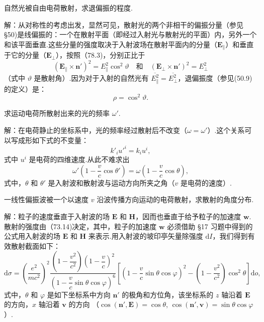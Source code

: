 \begin{xiti}
\quad 自然光被自由电荷散射，求退偏振的程度.

解：从对称性的考虑出发，显然可见，散射光的两个非相干的偏振分量（参见 §50)是线偏振的：一个在散射平面（即经过入射光与散射光的平面）内，另外一个和该平面垂直.这些分量的强度取决于入射波场在散射平面内的分量（$\boldsymbol{E}_{\parallel}$）和垂直于它的分量（$\boldsymbol{E}_{\perp}$），按照（78.3)，分别正比于
\begin{equation*}
  (\boldsymbol{E}_{\parallel}\times\boldsymbol{n}')^2
  =E_{\parallel}^2\cos^2\vartheta
  \quad\text{和}\quad
  (\boldsymbol{E}_{\perp}\times\boldsymbol{n}')^2=E_{\perp}^2
\end{equation*}
（式中 $\vartheta$ 是散射角）.因为对于入射的自然光有 $\overline{E_{\parallel}^2}=\overline{E_{\perp}^2}$，退偏振度（参见(50.9)的定义）是：
\begin{equation*}
  \rho=\cos^2\vartheta.
\end{equation*}

\quad 求运动电荷所散射出来的光的频率 $\omega'$.

解：在电荷静止的坐标系中，光的频率经过散射后不改变（$\omega=\omega'$）.这个关系可以写成形如下式的不变量：
\begin{equation*}
  k'_iu'^i=k_iu^i,
\end{equation*}
式中 $u^i$ 是电荷的四维速度.从此不难求出
\begin{equation*}
  \omega'\left(1-\frac{v}{c}\cos\theta'\right)
  =\omega\left(1-\frac{v}{c}\cos\theta\right),
\end{equation*}
式中，$\theta$ 和 $\theta'$ 是入射波和散射波与运动方向所夹之角（$v$ 是电荷的速度）.

\quad 一线性偏振波被一个以速度 $v$ 沿波传播方向运动的电荷散射，求散射的角度分布.

解：粒子的速度垂直于入射波的场 $\boldsymbol{E}$ 和 $\boldsymbol{H}$，因而也垂直于给予粒子的加速度 $\boldsymbol{w}$.散射的强度由（73.14)决定，其中，粒子的加速度 $\boldsymbol{w}$ 必须借助 §17 习题中得到的公式用入射波的场 $\boldsymbol{E}$ 和 $\boldsymbol{H}$ 来表示.用入射波的坡印亭矢量除强度 $\mathrm{d}I$，我们得到有效散射截面如下：
\begin{equation*}
  \mathrm{d}\sigma=\left(\frac{e^2}{mc^2}\right)^{\!2}
  \frac{\left(1-\dfrac{v^2}{c^2}\right)\left(1-\dfrac{v}{c}\right)^{\!2}}
  {\left(1-\dfrac{v}{c}\sin\theta\cos\varphi\right)^{\!6}}
  \left[\left(1-\frac{v}{c}\sin\theta\cos\varphi\right)^{\!2}
  -\left(1-\frac{v^2}{c^2}\right)\cos^2\theta\right]\mathrm{d}o,
\end{equation*}
式中，$\theta$ 和 $\varphi$ 是如下坐标系中方向 $\boldsymbol{n}'$ 的极角和方位角，该坐标系的 $z$ 轴沿着 $\boldsymbol{E}$ 的方向，$x$ 轴沿着 $\boldsymbol{v}$ 的方向
（$\cos(\boldsymbol{n}',\boldsymbol{E})=\cos\theta$, $\cos(\boldsymbol{n}',\boldsymbol{v})=\sin\theta\cos\varphi$）.


\end{xiti}
